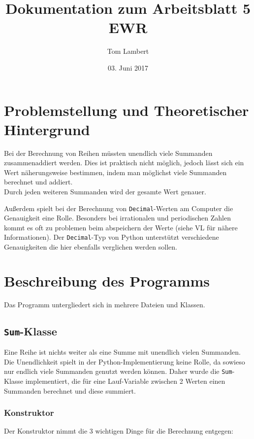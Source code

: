 \documentclass{article}
\title{Dokumentation zum Arbeitsblatt 5 EWR}
\author{Tom Lambert}
\date{03. Juni 2017}
\begin{document}
	
	\maketitle
	\tableofcontents
	\newpage
	
	
	\section{Problemstellung und Theoretischer Hintergrund}
	
	Bei der Berechnung von Reihen müssten unendlich viele Summanden zusammenaddiert werden. Dies ist praktisch nicht möglich, jedoch lässt sich ein Wert näherungsweise bestimmen, indem man möglichst viele Summanden berechnet und addiert. \\
	Durch jeden weiteren Summanden wird der gesamte Wert genauer.
	
	Außerdem spielt bei der Berechnung von \texttt{Decimal}-Werten am Computer die Genauigkeit eine Rolle. Besonders bei irrationalen und periodischen Zahlen kommt es oft zu problemen beim abspeichern der Werte (siehe VL für nähere Informationen). Der \verb|Decimal|-Typ von Python unterstützt verschiedene Genauigkeiten die hier ebenfalls verglichen werden sollen.
		
	
	\section{Beschreibung des Programms}
	
	Das Programm untergliedert sich in mehrere Dateien und Klassen.
	
	\subsection{\texttt{Sum}-Klasse}
	
	Eine Reihe ist nichts weiter als eine Summe mit unendlich vielen Summanden. Die Unendlichkeit spielt in der Python-Implementierung keine Rolle, da sowieso nur endlich viele Summanden genutzt werden können. Daher wurde die \verb|Sum|-Klasse implementiert, die für eine Lauf-Variable zwischen 2 Werten einen Summanden berechnet und diese summiert.
	
	\subsubsection{Konstruktor}
	
	Der Konstruktor nimmt die 3 wichtigen Dinge für die Berechnung entgegen:
	
\end{document}
